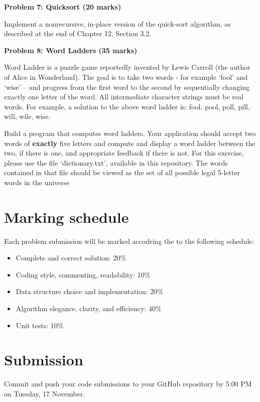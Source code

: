\documentclass{article}
\begin{document}
\textbf{Problem 7: Quicksort (20 marks)}

Implement a nonrecursive, in-place version of the quick-sort algorithm, as
described at the end of Chapter 12, Section 3.2.

\textbf{Problem 8: Word Ladders (35 marks)}

Word Ladder is a puzzle game reportedly invented by Lewis Carroll (the author of Alice in
Wonderland). The goal is to take two words - for example ‘fool’ and ‘wise’ – and progress from the
first word to the second by sequentially changing exactly one letter of the word. All intermediate
character strings must be real words. For example, a solution to the above word ladder is: fool, pool,
poll, pill, will, wile, wise.

Build a program that computes word ladders. Your application should accept two words of \textbf{exactly}
five letters and compute and display a word ladder between the two, if there is one, and
appropriate feedback if there is not. For this exercise, please use the file ‘dictionary.txt’, available in this repository.
 The words contained in that file should be viewed as the set of all possible legal 5-letter
words in the universe 


\section{Marking schedule}

Each problem submission will be marked accodring the to the following schedule:

\begin{itemize}
	\item Complete and correct solution: 20\%
	\item Coding style, commenting, readability: 10\% 
	\item Data structure choice and implementation: 20\%
	\item Algorithm elegance, clarity, and efficiency: 40\%
	\item Unit tests: 10\%
\end{itemize}


\section{Submission}
Commit and push your code submissions to your GitHub repository by 5:00 PM on Tuesday, 17 November.
\end{document}
